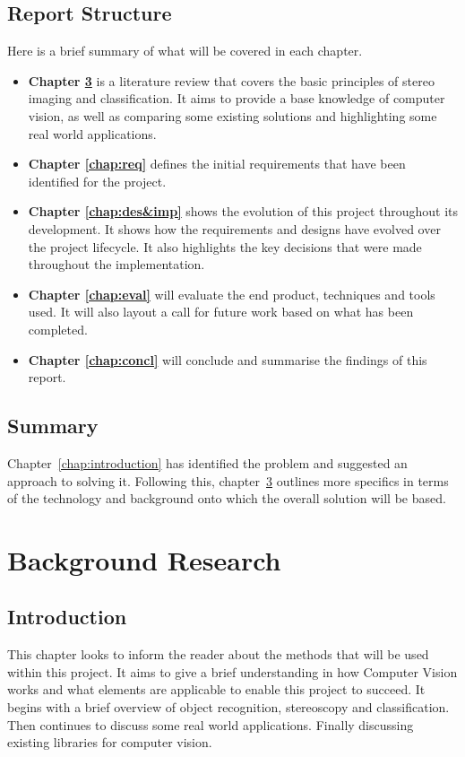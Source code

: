\documentclass[11pt,oneside]{report}
\begin{document}
		\section{Report Structure}
			Here is a brief summary of what will be covered in each chapter.
			\begin{itemize}
			 \item \textbf{Chapter \ref{chap:background}}
			 	is a literature review that covers the basic principles of stereo imaging and classification. It aims to provide a base knowledge of computer vision, as well as comparing some existing solutions and highlighting some real world applications.
			 \item \textbf{Chapter \ref{chap:req}}
			 	defines the initial requirements that have been identified for the project.
			 \item \textbf{Chapter \ref{chap:des&imp}}
			 	shows the evolution of this project throughout its development.
			 	It shows how the requirements and designs have evolved over the project lifecycle.
			 	It also highlights the key decisions that were made throughout the implementation.
			 	
			 \item \textbf{Chapter \ref{chap:eval}}
			 	will evaluate the end product, techniques and tools used. It will also layout a call for future work based on what has been completed.
			 \item \textbf{Chapter \ref{chap:concl}} will conclude and summarise the findings of this report.
			\end{itemize}
						
		\section{Summary}
		Chapter~\ref{chap:introduction} has identified the problem and suggested an approach to solving it.
		Following this, chapter~\ref{chap:background} outlines more specifics in terms of the technology and background onto which the overall solution will be based.
		
	\chapter{Background Research}\label{chap:background}
			\section{Introduction}
			This chapter looks to inform the reader about the methods that will be used within this project.
			It aims to give a brief understanding in how Computer Vision works and what elements are applicable to enable this project to succeed.
			It begins with a brief overview of object recognition, stereoscopy and classification.
			Then continues to discuss some real world applications.
			Finally discussing existing libraries for computer vision.
			
\end{document}
